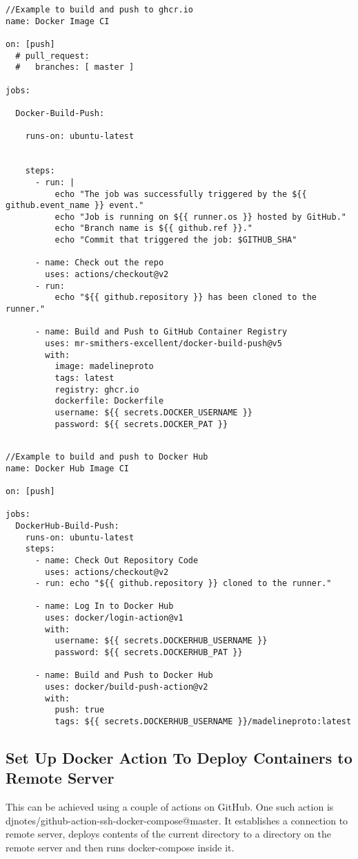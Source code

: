 \documentclass{article}
\begin{document}
\begin{lstlisting}
//Example to build and push to ghcr.io
name: Docker Image CI

on: [push]
  # pull_request:
  #   branches: [ master ]

jobs:

  Docker-Build-Push:

    runs-on: ubuntu-latest
        

    steps:
      - run: |
          echo "The job was successfully triggered by the ${{ github.event_name }} event."
          echo "Job is running on ${{ runner.os }} hosted by GitHub."
          echo "Branch name is ${{ github.ref }}."
          echo "Commit that triggered the job: $GITHUB_SHA"
          
      - name: Check out the repo
        uses: actions/checkout@v2
      - run: 
          echo "${{ github.repository }} has been cloned to the runner." 

      - name: Build and Push to GitHub Container Registry
        uses: mr-smithers-excellent/docker-build-push@v5
        with:
          image: madelineproto
          tags: latest
          registry: ghcr.io
          dockerfile: Dockerfile
          username: ${{ secrets.DOCKER_USERNAME }}
          password: ${{ secrets.DOCKER_PAT }}


\end{lstlisting}

\begin{lstlisting}
//Example to build and push to Docker Hub
name: Docker Hub Image CI

on: [push]

jobs:
  DockerHub-Build-Push: 
    runs-on: ubuntu-latest
    steps:
      - name: Check Out Repository Code 
        uses: actions/checkout@v2
      - run: echo "${{ github.repository }} cloned to the runner."
      
      - name: Log In to Docker Hub
        uses: docker/login-action@v1
        with:
          username: ${{ secrets.DOCKERHUB_USERNAME }}
          password: ${{ secrets.DOCKERHUB_PAT }}

      - name: Build and Push to Docker Hub
        uses: docker/build-push-action@v2
        with: 
          push: true
          tags: ${{ secrets.DOCKERHUB_USERNAME }}/madelineproto:latest

\end{lstlisting}

\subsection{Set Up Docker Action To Deploy Containers to Remote Server}
This can be achieved using a couple of actions on GitHub. One such action 
is djnotes/github-action-ssh-docker-compose@master. 
It establishes a connection to remote server, deploys contents of the current directory
to a directory on the remote server and then runs docker-compose inside it. 
\end{document}
